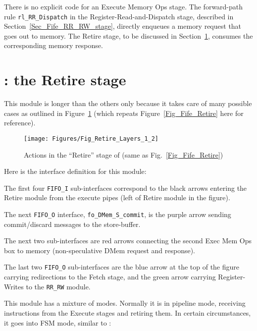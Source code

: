There is no explicit code for an Execute Memory Ops stage.  The
forward-path rule \verb|rl_RR_Dispatch| in the
Register-Read-and-Dispatch stage, described in
Section~\ref{Sec_Fife_RR_RW_stage}, directly enqueues a memory request
that goes out to memory.  The Retire stage, to be discussed in
Section~\ref{Sec_Fife_Retire_code}, consumes the corresponding memory
response.


\section{{\FIFE}: the Retire stage}

\label{Sec_Fife_Retire_code}

This module is longer than the others only because it takes care of
many possible cases as outlined in Figure~\ref{Fig_Fife_Retire_2}
(which repeats Figure~\ref{Fig_Fife_Retire} here for reference).
\begin{figure}[htbp]
  \centerline{\texttt{[image: Figures/Fig\_Retire\_Layers\_1\_2]}}
  \caption{\label{Fig_Fife_Retire_2}
           Actions in the ``Retire'' stage of {\FIFE}
	   (same as Fig.~\ref{Fig_Fife_Retire})}
\end{figure}

Here is the interface definition for this module:


The first four \verb|FIFO_I| sub-interfaces correspond to the black
arrows entering the Retire module from the execute pipes (left of
Retire module in the figure).

The next \verb|FIFO_O| interface, \verb|fo_DMem_S_commit|, is the
purple arrow sending commit/discard messages to the store-buffer.

The next two sub-interfaces are red arrows connecting the second Exec
Mem Ops box to memory (non-speculative DMem request and response).

The last two \verb|FIFO_O| sub-interfaces are the blue arrow at the
top of the figure carrying redirections to the Fetch stage, and the
green arrow carrying Register-Writes to the \verb|RR_RW| module.

This module has a mixture of modes.  Normally it is in pipeline mode,
receiving instructions from the Execute stages and retiring them.  In
certain circumstances, it goes into FSM mode, similar to {\DRUM}:

